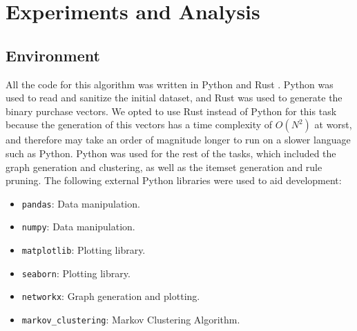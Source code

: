 \chapter{Experiments and Analysis}

\section{Environment}
All the code for this algorithm was written in Python  and Rust . Python was used to read and sanitize the initial dataset, and Rust was used to generate the binary purchase vectors. We opted to use Rust instead of Python for this task because the generation of this vectors has a time complexity of $O(N^2)$ at worst, and therefore may take an order of magnitude longer to run on a slower language such as Python. Python was used for the rest of the tasks, which included the graph generation and clustering, as well as the itemset generation and rule pruning. The following external Python libraries were used to aid development:
\begin{itemize}
\item \texttt{pandas}: Data manipulation.
\item \texttt{numpy}: Data manipulation.
\item \texttt{matplotlib}: Plotting library.
\item \texttt{seaborn}: Plotting library.
\item \texttt{networkx}: Graph generation and plotting.
\item \texttt{markov\_clustering}: Markov Clustering Algorithm.
\end{itemize}


